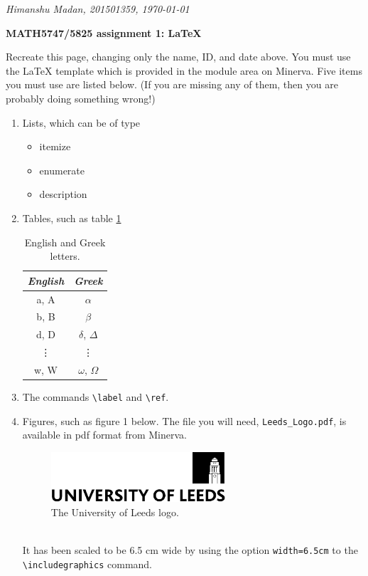 \documentclass[10pt, a4paper]{article}
\begin{document}
\begin{flushright}
\UKvardate
{\em Himanshu Madan, 201501359, \today}
\end{flushright}
\begin{center}
    {\bf \Large MATH5747/5825 assignment 1: {\LaTeX} }
\end{center}

{\indent Recreate this page, changing only the name, ID, and date above. You must use the {\LaTeX} template which is provided in the module area on Minerva. Five items you must use are listed below. (If you are missing any of them, then you are probably doing something wrong!)}
\begin{enumerate}
    \item Lists, which can be of type
        \begin{itemize}
            \item 
                itemize
            \item 
                enumerate
            \item
                description
        \end{itemize}
    \item 
        Tables, such as table \ref{tab:Table1}
    \begin{table}[h!]
    \begin{center}
        \begin{tabular}{c|c}
        {\em English} & {\em Greek}\\
        \hline
        a, A & $\alpha$\\
        b, B & $\beta$\\
        d, D & $\delta$, $\Delta$\\
        \vdots & \vdots\\
        w, W & $\omega$, $\Omega$
        \end{tabular}
    \end{center}
    \caption{English and Greek letters.}
    \label{tab:Table1}
    \end{table}
    \item
    The commands \verb|\label| and \verb|\ref|.
    \item 
    Figures, such as figure 1 below. The file you will need, \verb|Leeds_Logo.pdf|, is available in pdf format  from Minerva.
    \begin{figure}[h]
	\includegraphics[width=6.5cm]{Leeds_Logo}
	\centering
	\caption{The University of Leeds logo.}
    \end{figure}\\
    It has been scaled to be 6.5 cm wide by using the option \verb|width=6.5cm| to the \verb|\includegraphics| command.
    

\end{enumerate}
\end{document}
